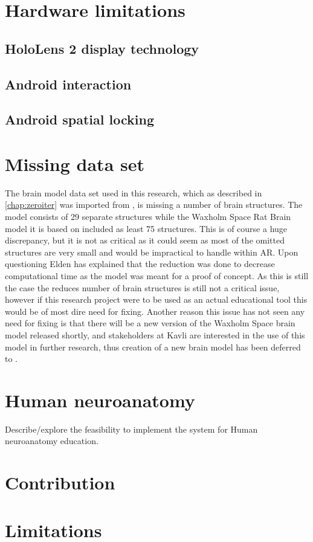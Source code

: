 \section{Hardware limitations}

\subsection*{HoloLens 2 display technology}

\subsection*{Android interaction}

\subsection*{Android spatial locking}

\section{Missing data set}
The brain model data set used in this research, which as described in \autoref{chap:zeroiter} was imported from , is missing a number of brain structures. The model consists of 29 separate structures while the Waxholm Space Rat Brain model it is based on included as least 75 structures. This is of course a huge discrepancy, but it is not as critical as it could seem as most of the omitted structures are very small and would be impractical to handle within AR. Upon questioning Elden has explained that the reduction was done to decrease computational time as the model was meant for a proof of concept. As this is still the case the reduces number of brain structures is still not a critical issue, however if this research project were to be used as an actual educational tool this would be of most dire need for fixing. Another reason this issue has not seen any need for fixing is that there will be a new version of the Waxholm Space brain model released shortly, and stakeholders at Kavli are interested in the use of this model in further research, thus creation of a new brain model has been deferred to .

\section{Human neuroanatomy}
Describe/explore the feasibility to implement the system for Human neuroanatomy education.

\section{Contribution}

\section{Limitations}